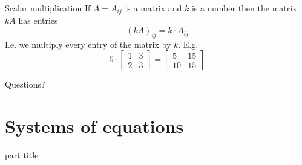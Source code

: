 \documentclass{beamer}
\begin{document}
\begin{frame}{Scalar multiplication}
  If $A = A_{ij}$ is a matrix and $k$ is a number then the matrix $kA$ has entries
  \begin{equation*}
    (kA)_{ij} = k\cdot A_{ij}
  \end{equation*}\vfill
  I.e. we multiply every entry of the matrix by $k$. E.g.\vfill
  \begin{equation*}
    5\cdot \left[
        \begin{array}{cc}
          1 & 3 \\
          2 & 3
        \end{array}
      \right]=
      \left[
        \begin{array}{cc}
          5 & 15 \\
          10 & 15
        \end{array}
      \right]
  \end{equation*}
\end{frame}

\begin{frame}
  Questions?
\end{frame}

\section{Systems of equations}

\begin{frame}
  \begin{beamercolorbox}[sep=12pt,center]{part title}
    \insertsection\par
  \end{beamercolorbox}
\end{frame}
\end{document}
